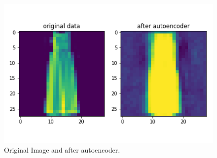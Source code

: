 \documentclass[11pt,a4paper,oneside]{article}
\begin{document}
\begin{figure}[!btp]
	\centering
	\includegraphics[width=\textwidth]{figures/save_ev_9}
	\caption{Original Image and after autoencoder.}
\end{figure}

\FloatBarrier
\end{document}
